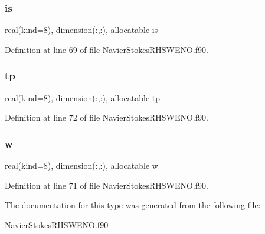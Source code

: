 \subsubsection{\texorpdfstring{is}{is}}
{\footnotesize\ttfamily real(kind=8), dimension(\+:,\+:), allocatable is}



Definition at line 69 of file Navier\+Stokes\+R\+H\+S\+W\+E\+N\+O.\+f90.

\hypertarget{structnavierstokesrhsweno_1_1upwinding__local_a17b5c236c24dc2c39c875ab0c481d606}{}\label{structnavierstokesrhsweno_1_1upwinding__local_a17b5c236c24dc2c39c875ab0c481d606} 
\subsubsection{\texorpdfstring{tp}{tp}}
{\footnotesize\ttfamily real(kind=8), dimension(\+:,\+:), allocatable tp}



Definition at line 72 of file Navier\+Stokes\+R\+H\+S\+W\+E\+N\+O.\+f90.

\hypertarget{structnavierstokesrhsweno_1_1upwinding__local_a0828fbaa900a2324fd600b8ded289644}{}\label{structnavierstokesrhsweno_1_1upwinding__local_a0828fbaa900a2324fd600b8ded289644} 
\subsubsection{\texorpdfstring{w}{w}}
{\footnotesize\ttfamily real(kind=8), dimension(\+:,\+:), allocatable w}



Definition at line 71 of file Navier\+Stokes\+R\+H\+S\+W\+E\+N\+O.\+f90.



The documentation for this type was generated from the following file\+:\begin{DoxyCompactItemize}
\item 
\hyperlink{NavierStokesRHSWENO_8f90}{Navier\+Stokes\+R\+H\+S\+W\+E\+N\+O.\+f90}\end{DoxyCompactItemize}
